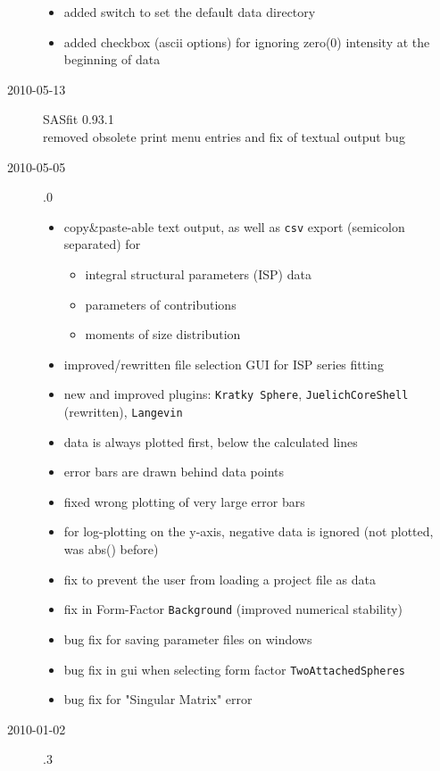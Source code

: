 \begin{description}
\begin{itemize}
        \item added switch to set the default data directory
        \item added checkbox (ascii options) for ignoring zero(0) intensity at the beginning of data
        \end{itemize}
    \item[2010-05-13] SASfit 0.93.1 \\
    removed obsolete print menu entries and fix of textual output bug
    \item[2010-05-05] .0
        \begin{itemize}
            \item copy\&paste-able text output, as well as \texttt{csv} export (semicolon separated) for
            \begin{itemize}
                \item integral structural parameters (ISP) data
                \item parameters of contributions
                \item moments of size distribution
            \end{itemize}
            \item  improved/rewritten file selection GUI for ISP series fitting
            \item  new and improved plugins: \texttt{Kratky Sphere}, \texttt{JuelichCoreShell} (rewritten), \texttt{Langevin}
            \item data is always plotted first, below the calculated lines
            \item error bars are drawn behind data points
            \item fixed wrong plotting of very large error bars
            \item for log-plotting on the y-axis, negative data is ignored (not plotted, was abs() before)
            \item fix to prevent the user from loading a \SASfit project file as data
            \item fix in Form-Factor \texttt{Background} (improved numerical stability)
            \item bug fix for saving parameter files on windows
            \item bug fix in gui when selecting form factor \texttt{TwoAttachedSpheres}
            \item bug fix for "Singular Matrix" error
        \end{itemize}
    \item[2010-01-02] .3

\end{description}
